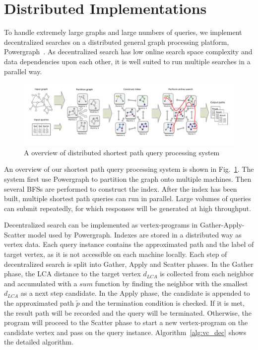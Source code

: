 \section{Distributed Implementations}
\label{implementation}

To handle extremely large graphs and large numbers of queries, we implement decentralized searches on a distributed general graph processing platform, Powergraph~\cite{180251}. As decentralized search has low online search space complexity and data dependencies upon each other, it is well suited to run multiple searches in a parallel way. 

\begin{figure}[ht]
		\vspace{-0.7cm}
    \centering
    \includegraphics[width=\linewidth]{./figures/new_illustrate/system.pdf}
		\vspace{-1.2cm}
    \caption{A overview of distributed shortest path query processing system}
    \label{fig:system}
		\vspace{-2mm}
\end{figure}

An overview of our shortest path query processing system is shown in Fig.~\ref{fig:system}. The system first use Powergraph to partition the graph onto multiple machines. Then several BFSs are performed to construct the index. After the index has been built, multiple shortest path queries can run in parallel. Large volumes of queries can submit repeatedly, for which responses will be generated at high throughput.


Decentralized search can be implemented as vertex-programs in Gather-Apply-Scatter model used by Powergraph. Indexes are stored in a distributed way as vertex data. Each query instance contains the approximated path and the label of target vertex, as it is not accessible on each machine locally. Each step of decentralized search is split into Gather, Apply and Scatter phases. In the Gather phase, the LCA distance to the target vertex $d_{LCA}$ is collected from each neighbor and accumulated with a $sum$ function by finding the neighbor with the smallest $d_{LCA}$ as a next step candidate. In the Apply phase, the candidate is appended to the approximated path $\tilde{p}$ and the termination condition is checked. If it is met, the result path will be recorded and the query will be terminated. Otherwise, the program will proceed to the Scatter phase to start a new vertex-program on the candidate vertex and pass on the query instance. Algorithm~\ref{alg:vc_dec} shows the detailed algorithm.

